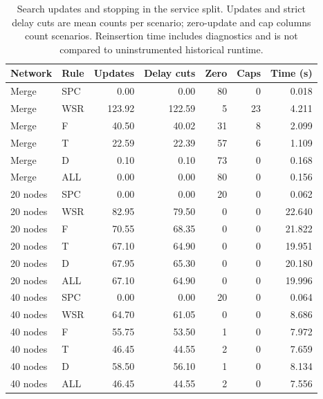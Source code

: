 \begin{table}[!htbp]
\caption{Search updates and stopping in the service split. Updates and strict delay cuts are mean counts per scenario; zero-update and cap columns count scenarios. Reinsertion time includes diagnostics and is not compared to uninstrumented historical runtime.}\label{tab:service-split-timing}
\centering\small
\begin{tabularx}{\textwidth}{l l r r r r r}
\toprule Network & Rule & Updates & Delay cuts & Zero & Caps & Time (s)\\\midrule
Merge & SPC & 0.00 & 0.00 & 80 & 0 & 0.018\\
Merge & WSR & 123.92 & 122.59 & 5 & 23 & 4.211\\
Merge & F & 40.50 & 40.02 & 31 & 8 & 2.099\\
Merge & T & 22.59 & 22.39 & 57 & 6 & 1.109\\
Merge & D & 0.10 & 0.10 & 73 & 0 & 0.168\\
Merge & ALL & 0.00 & 0.00 & 80 & 0 & 0.156\\
20 nodes & SPC & 0.00 & 0.00 & 20 & 0 & 0.062\\
20 nodes & WSR & 82.95 & 79.50 & 0 & 0 & 22.640\\
20 nodes & F & 70.55 & 68.35 & 0 & 0 & 21.822\\
20 nodes & T & 67.10 & 64.90 & 0 & 0 & 19.951\\
20 nodes & D & 67.95 & 65.30 & 0 & 0 & 20.180\\
20 nodes & ALL & 67.10 & 64.90 & 0 & 0 & 19.996\\
40 nodes & SPC & 0.00 & 0.00 & 20 & 0 & 0.064\\
40 nodes & WSR & 64.70 & 61.05 & 0 & 0 & 8.686\\
40 nodes & F & 55.75 & 53.50 & 1 & 0 & 7.972\\
40 nodes & T & 46.45 & 44.55 & 2 & 0 & 7.659\\
40 nodes & D & 58.50 & 56.10 & 1 & 0 & 8.134\\
40 nodes & ALL & 46.45 & 44.55 & 2 & 0 & 7.556\\
\bottomrule
\end{tabularx}
\end{table}
